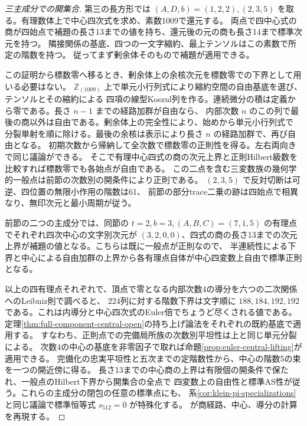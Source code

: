 \begin{proof}[三主成分での開集合]
第三の長方形では $(A,D,b)=(1,2,2),(2,3,5)$ を取る。有理数体上で中心四次式を求め、素数1009で還元する。
両点で四中心式の商が四始点で補題の長さ13までの値を持ち、還元後の元の商も長さ14まで標準次元を持つ。
隣接関係の基底、四つの一文字縮約、最上テンソルはこの素数で所定の階数を持つ。
従ってまず剰余体そのもので補題が適用できる。

この証明から標数零へ移るとき、剰余体上の余核次元を標数零での下界として用いる必要はない。
$\mathbb Z_{(1009)}$ 上で単元小行列式により縮約空間の自由基底を選び、テンソルとその縮約による
四項の線型Koszul列を作る。連続微分の積は定義から零である。長さ $n-1$ までの経路加群が自由なら、
内部次数 $n$ のこの列で最後の商以外は自由である。剰余体上の完全性により、始めから単元小行列式で
分裂単射を順に除ける。最後の余核は表示により長さ $n$ の経路加群で、再び自由となる。
初期次数から帰納して全次数で標数零の正則性を得る。左右両向きで同じ議論ができる。
そこで有理中心四式の商の次元上界と正則Hilbert級数を比較すれば標数零でも各始点が自由である。
この二点を含む三変数族の幾何学的一般点は前節の次数別の開条件により正則である。
$(2,3,5)$ で反対切断は可逆、四位置の無限小作用の階数は61、
前節の部分trace二乗の跡は四始点で相異なり、無印次元と最小周期が従う。

前節の二つの主成分では、同節の $t=2,b=3,(A,B,C)=(7,1,5)$ の有理点でそれぞれ四次中心の文字別次元が
$(3,2,0,0)$、四式の商の長さ13までの次元上界が補題の値となる。こちらは既に一般点が正則なので、
半連続性による下界と中心による自由加群の上界から各有理点自体が中心四変数上自由で標準正則となる。

以上の四有理点それぞれで、頂点で零となる内部次数4の導分を六つの二次関係へのLeibniz則で調べると、
224列に対する階数下界は文字順に $188,184,192,192$ である。これは内導分と中心四次式のEuler倍でちょうど尽くされる値である。
定理\ref{thm:full-component-central-open}の持ち上げ論法をそれぞれの既約基底で適用する。
すなわち、正則点での完備局所族の次数別平坦性は上と同じ単元分裂による。
次数4の中心の基底を非零因子で取れば命題\ref{prop:euler-central-lifting}が適用できる。
完備化の忠実平坦性と五次までの定階数性から、中心の階数5の束を一つの開近傍に得る。
長さ13までの中心商の上界は有限個の開条件で保たれ、一般点のHilbert下界から開集合の全点で
四変数上の自由性と標準AS性が従う。これらの主成分の閉包の任意の標準点にも、
系\ref{cor:klein-pi-specializations}と同じ議論で標準恒等式 $s_{512}=0$ が特殊化する。
 が商経路、中心、導分の計算を再現する。
\end{proof}
